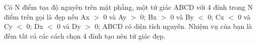 Có N điểm tọa độ nguyên trên mặt phẳng, một tứ giác ABCD với 4 đỉnh trong N điểm trên gọi là đẹp nếu     Ax $>$ 0 và Ay $>$ 0;     Bx $>$ 0 và By $<$ 0;     Cx $<$ 0 và Cy $<$ 0;     Dx $<$ 0 và Dy $>$ 0;     ABCD có diện tích nguyên. Nhiệm vụ của bạn là đếm tất cả các cách chọn 4 đỉnh tạo nên tứ giác đẹp.